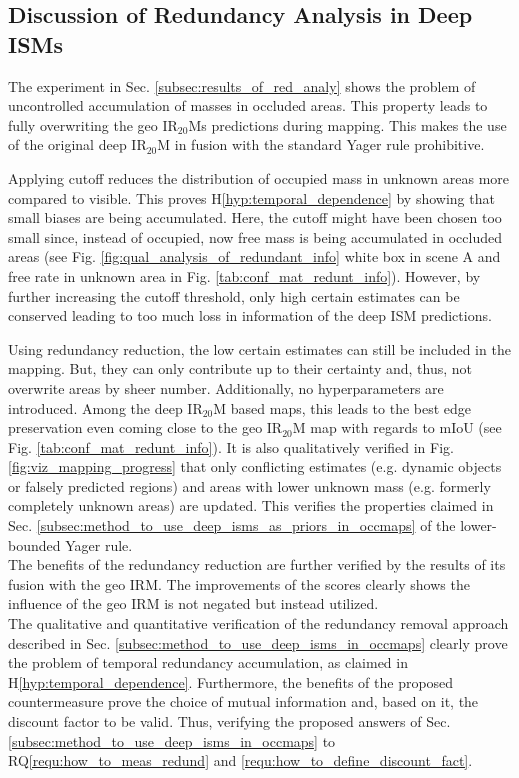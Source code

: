 \subsection{Discussion of Redundancy Analysis in Deep ISMs}
\label{subsec:discussion_of_red_analy}
The experiment in Sec. \ref{subsec:results_of_red_analy} shows the problem of uncontrolled accumulation of masses in occluded areas. This property leads to fully overwriting the geo IR$_{20}$Ms predictions during mapping. This makes the use of the original deep IR$_{20}$M in fusion with the standard Yager rule prohibitive. 

Applying cutoff reduces the distribution of occupied mass in unknown areas more compared to visible. This proves H\ref{hyp:temporal_dependence} by showing that small biases are being accumulated. Here, the cutoff might have been chosen too small since, instead of occupied, now free mass is being accumulated in occluded areas (see Fig. \ref{fig:qual_analysis_of_redundant_info} white box in scene A and free rate in unknown area in Fig. \ref{tab:conf_mat_redunt_info}). However, by further increasing the cutoff threshold, only high certain estimates can be conserved leading to too much loss in information of the deep ISM predictions. 

Using redundancy reduction, the low certain estimates can still be included in the mapping. But, they can only contribute up to their certainty and, thus, not overwrite areas by sheer number. Additionally, no hyperparameters are introduced. Among the deep IR$_{20}$M based maps, this leads to the best edge preservation even coming close to the geo IR$_{20}$M map with regards to mIoU (see Fig. \ref{tab:conf_mat_redunt_info}). It is also qualitatively verified in Fig. \ref{fig:viz_mapping_progress} that only conflicting estimates (e.g. dynamic objects or falsely predicted regions) and areas with lower unknown mass (e.g. formerly completely unknown areas) are updated. This verifies the properties claimed in Sec. \ref{subsec:method_to_use_deep_isms_as_priors_in_occmaps} of the lower-bounded Yager rule.\\
The benefits of the redundancy reduction are further verified by the results of its fusion with the geo IRM. The improvements of the scores clearly shows the influence of the geo IRM is not negated but instead utilized.\\
The qualitative and quantitative verification of the redundancy removal approach described in Sec. \ref{subsec:method_to_use_deep_isms_in_occmaps} clearly prove the problem of temporal redundancy accumulation, as claimed in H\ref{hyp:temporal_dependence}. Furthermore, the benefits of the proposed countermeasure prove the choice of mutual information and, based on it, the discount factor to be valid. Thus, verifying the proposed answers of Sec. \ref{subsec:method_to_use_deep_isms_in_occmaps} to RQ\ref{requ:how_to_meas_redund} and \ref{requ:how_to_define_discount_fact}.


